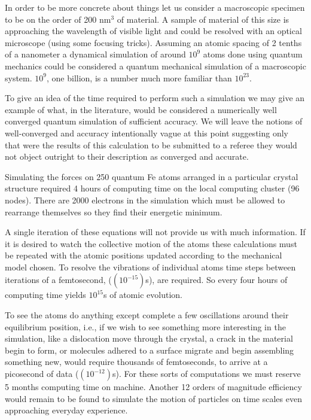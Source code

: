 In order to be more concrete about things let us consider a macroscopic specimen 
to be on the order of 200 nm$^{3}$ of material. A sample of material of this size 
is approaching the wavelength of visible light and could be
resolved with an optical microscope (using some focusing tricks). 
Assuming an atomic spacing of 2 tenths 
of a nanometer a dynamical simulation of around $10^{9}$ atoms 
done using quantum mechanics could be considered a quantum mechanical 
simulation of a macroscopic system. $10^{9}$, one billion, is a number
much more familiar than $10^{23}$.

To give an idea of the time required to perform such a simulation 
we may give an example of what, in the literature, would be considered 
a numerically well converged quantum simulation of sufficient accuracy. 
We will leave the notions of well-converged and accuracy intentionally vague
at this point suggesting only that were the results of this calculation
to be submitted to a referee they would not object outright to their
description as converged and accurate.

Simulating the forces on 250 quantum Fe atoms arranged in a particular crystal structure
required 4 hours of computing time on the local computing cluster (96 nodes).
There are 2000 electrons in the simulation which must be allowed
to rearrange themselves so they find their energetic minimum. 

A single iteration of these equations will not provide us with 
much information. If it is desired to watch the collective 
motion of the atoms these calculations must be repeated with
the atomic positions updated according to the mechanical model chosen.
To resolve the vibrations of individual atoms  
time steps between iterations of a femtosecond, ($(10^{-15})$s),
are required. So every four hours of computing time yields $10^{15}$s
of atomic evolution.

To see the atoms do anything except complete a few oscillations around
their equilibrium position, i.e., if we wish to see something more interesting
in the simulation, like a dislocation
move through the crystal, a crack in the material begin to form, or
molecules adhered to a surface migrate and begin assembling something new,
would require thousands of femtoseconds, to arrive at a picosecond of data ($(10^{-12})$s).
For these sorts of computations we must reserve 5 months computing time on machine.
Another 12 orders of magnitude efficiency would remain to be found to 
simulate the motion of particles on time scales even approaching 
everyday experience.

